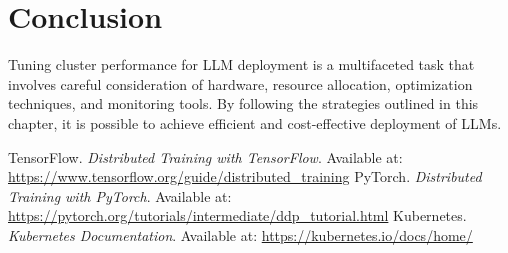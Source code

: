 \section{Conclusion}

Tuning cluster performance for LLM deployment is a multifaceted task that involves careful consideration of hardware, resource allocation, optimization techniques, and monitoring tools. By following the strategies outlined in this chapter, it is possible to achieve efficient and cost-effective deployment of LLMs.

\begin{thebibliography}{9}
 TensorFlow. \textit{Distributed Training with TensorFlow}. Available at: \url{https://www.tensorflow.org/guide/distributed_training}
 PyTorch. \textit{Distributed Training with PyTorch}. Available at: \url{https://pytorch.org/tutorials/intermediate/ddp_tutorial.html}
 Kubernetes. \textit{Kubernetes Documentation}. Available at: \url{https://kubernetes.io/docs/home/}
\end{thebibliography}